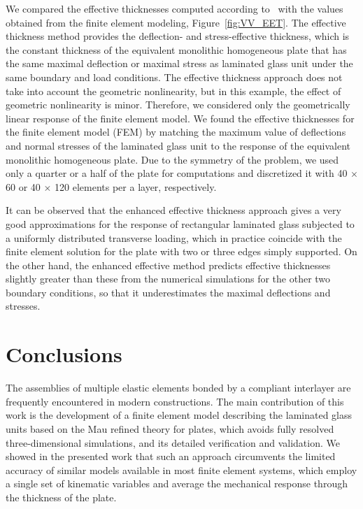 \documentclass[11pt]{article}
\begin{document}
We compared the effective thicknesses computed according to~\cite{Galuppi:2012:PEFD} with the values obtained from the finite element modeling, Figure~\ref{fig:VV_EET}. The effective thickness method provides the deflection- and stress-effective thickness, which is the constant thickness of the equivalent monolithic homogeneous plate that has the same maximal deflection or maximal stress as laminated glass unit under the same boundary and load conditions. The effective thickness approach does not take into account the geometric nonlinearity, but in this example, the effect of geometric nonlinearity is minor. Therefore, we considered only the geometrically linear response of the finite element model. We found the effective thicknesses for the finite element model (FEM) by matching the maximum value of deflections and normal stresses of the laminated glass unit to the response of the equivalent monolithic homogeneous plate.
Due to the symmetry of the problem, we used only a quarter or a half of the plate for computations and discretized it with 40 $\times$ 60 or 40 $\times$ 120 elements per a layer, respectively. 

It can be observed that the enhanced effective thickness approach gives a very good approximations for the response of rectangular laminated glass subjected to a uniformly distributed transverse loading, which in practice coincide with the finite element solution for the plate with two or three edges simply supported. On the other hand, the enhanced effective method predicts effective thicknesses slightly greater than these from the numerical simulations for the other two boundary conditions, so that it underestimates the maximal deflections and stresses. 

\section{Conclusions}\label{sec:conclusions}


The assemblies of multiple elastic elements bonded by a compliant interlayer are frequently encountered in modern constructions.
The main contribution of this work is the development of a finite element model describing the laminated glass units based on the Mau refined theory for plates, which avoids fully resolved three-dimensional simulations, and its detailed verification and validation. We showed in the presented work that such an approach circumvents the limited accuracy of similar models available in most finite element systems, which employ a single set of kinematic variables and average the mechanical response through the thickness of the plate. 
\end{document}
